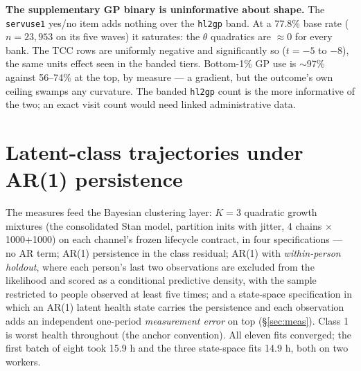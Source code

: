 \documentclass[11pt]{article}
\newcommand{\code}[1]{\texttt{\small #1}}
\begin{document}
\textbf{The supplementary GP binary is uninformative about shape.} The
\code{servuse1} yes/no item adds nothing over the \code{hl2gp} band. At a
77.8\% base rate ($n = 23{,}953$ on its five waves) it saturates: the $\theta$
quadratics are $\approx 0$ for every bank. The TCC rows are uniformly negative
and significantly so ($t = -5$ to $-8$), the same units effect seen in the
banded tiers. Bottom-1\% GP use is
$\sim$97\% against 56--74\% at the top, by measure --- a gradient, but the outcome's
own ceiling swamps any curvature. The banded \code{hl2gp} count is the more
informative of the two; an exact visit count would need linked administrative
data.

\section{Latent-class trajectories under AR(1) persistence}
\label{sec:ar1}

The measures feed the Bayesian clustering layer: $K=3$ quadratic growth
mixtures (the consolidated Stan model, partition inits with jitter, 4 chains
$\times$ 1000+1000) on each channel's frozen lifecycle contract, in four
specifications --- no AR term; AR(1) persistence in the class residual; AR(1)
with \emph{within-person holdout}, where each person's last two observations
are excluded from the likelihood and scored as a conditional predictive
density, with the sample restricted to people observed at least five times;
and a state-space specification in which an AR(1) latent health state carries
the persistence and each observation adds an independent one-period
\emph{measurement error} on top (\S\ref{sec:meas}). Class 1 is worst health
throughout (the anchor convention). All eleven fits converged; the first
batch of eight took 15.9 h and the three state-space fits 14.9 h, both on two
workers.
\end{document}
